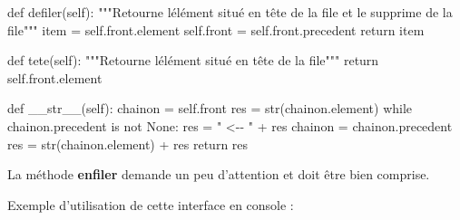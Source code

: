 \documentclass[
  a4paper,
  DIV=11,
  numbers=noendperiod]{scrartcl}
\newenvironment{Shaded}{\begin{snugshade}}{\end{snugshade}}
\newcommand{\BuiltInTok}[1]{\textcolor[rgb]{0.00,0.23,0.31}{#1}}
\newcommand{\CommentTok}[1]{\textcolor[rgb]{0.37,0.37,0.37}{#1}}
\newcommand{\ControlFlowTok}[1]{\textcolor[rgb]{0.00,0.23,0.31}{#1}}
\newcommand{\FunctionTok}[1]{\textcolor[rgb]{0.28,0.35,0.67}{#1}}
\newcommand{\KeywordTok}[1]{\textcolor[rgb]{0.00,0.23,0.31}{#1}}
\newcommand{\NormalTok}[1]{\textcolor[rgb]{0.00,0.23,0.31}{#1}}
\newcommand{\OperatorTok}[1]{\textcolor[rgb]{0.37,0.37,0.37}{#1}}
\newcommand{\StringTok}[1]{\textcolor[rgb]{0.13,0.47,0.30}{#1}}
\newcommand{\VariableTok}[1]{\textcolor[rgb]{0.07,0.07,0.07}{#1}}
\begin{document}
\begin{Shaded}
\begin{Highlighting}[]
    \KeywordTok{def}\NormalTok{ defiler(}\VariableTok{self}\NormalTok{):}
        \CommentTok{"""Retourne l\textquotesingle{}élément situé en tête de la file et le supprime de la file"""}
\NormalTok{        item }\OperatorTok{=} \VariableTok{self}\NormalTok{.front.element}
        \VariableTok{self}\NormalTok{.front }\OperatorTok{=} \VariableTok{self}\NormalTok{.front.precedent}
        \ControlFlowTok{return}\NormalTok{ item}

    \KeywordTok{def}\NormalTok{ tete(}\VariableTok{self}\NormalTok{):}
        \CommentTok{"""Retourne l\textquotesingle{}élément situé en tête de la file"""}
        \ControlFlowTok{return} \VariableTok{self}\NormalTok{.front.element}

    \KeywordTok{def} \FunctionTok{\_\_str\_\_}\NormalTok{(}\VariableTok{self}\NormalTok{):}
\NormalTok{        chainon }\OperatorTok{=} \VariableTok{self}\NormalTok{.front}
\NormalTok{        res }\OperatorTok{=} \BuiltInTok{str}\NormalTok{(chainon.element)}
        \ControlFlowTok{while}\NormalTok{ chainon.precedent }\KeywordTok{is} \KeywordTok{not} \VariableTok{None}\NormalTok{:}
\NormalTok{            res }\OperatorTok{=} \StringTok{" \textless{}{-}{-} "} \OperatorTok{+}\NormalTok{ res}
\NormalTok{            chainon }\OperatorTok{=}\NormalTok{ chainon.precedent}
\NormalTok{            res }\OperatorTok{=} \BuiltInTok{str}\NormalTok{(chainon.element) }\OperatorTok{+}\NormalTok{ res}
        \ControlFlowTok{return}\NormalTok{ res}
\end{Highlighting}
\end{Shaded}

La méthode \textbf{enfiler} demande un peu d'attention et doit être bien
comprise.

Exemple d'utilisation de cette interface en console :
\end{document}
